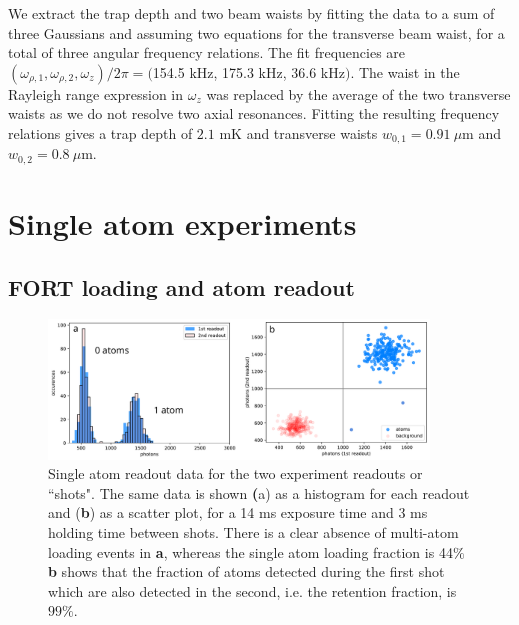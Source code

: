 We extract the trap depth and two beam waists by fitting the data to a sum of three Gaussians and assuming two equations for the transverse beam waist, for a total of three angular frequency relations. The fit frequencies are $(\omega_{\rho,1}, \omega_{\rho,2}, \omega_{z})/2\pi=($154.5 kHz, 175.3 kHz, 36.6 kHz$)$. The waist in the Rayleigh range expression in $\omega_z$ was replaced by the average of the two transverse waists as we do not resolve two axial resonances. Fitting the resulting frequency relations gives a trap depth of $2.1$ mK and transverse waists $w_{0,1}=0.91 ~\mu$m and $w_{0,2}=0.8 ~\mu$m.

\section{Single atom experiments}\label{sec:singleatomexperiments}

\subsection{FORT loading and atom readout}\label{sec:fort_loading}


\begin{figure}[!ht]
    \centering
    \includegraphics[width=0.9\textwidth]{Images/atom_histogram_and_scatterplot.pdf}
    \caption{Single atom readout data for the two experiment readouts or ``shots". The same data is shown \textbf({a}) as a histogram for each readout and (\textbf{b}) as a scatter plot, for a 14 ms exposure time and 3 ms holding time between shots. There is a clear absence of multi-atom loading events in \textbf{a}, whereas the single atom loading fraction is 44$\%$ \textbf{b} shows that the fraction of atoms detected during the first shot which are also detected in the second, i.e. the retention fraction, is $99\%$.}
    \label{fig:atom_histogram}
\end{figure}


